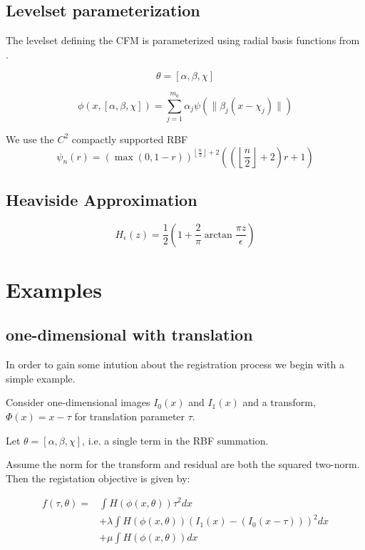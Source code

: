 \documentclass[]{paper}
\begin{document}
\subsection{Levelset parameterization}
The levelset defining the CFM is parameterized using radial basis
functions from \cite{Aghasi2011}.

\[
\theta = [\alpha, \beta, \chi]
\] 

\[
\phi(x,[\alpha, \beta, \chi]) = \sum_{j = 1}^{m_0} \alpha_j
\psi(\|\beta_j(x - \chi_j)\|) 
\]

We use the $C^2$ compactly supported RBF
\[
\psi_{n}(r) = \left ( \max{\left ( 0,1 - r \right )} \right )^{\left\lfloor
  \frac{n}{2}\right\rfloor + 2}\left ( \left ( \left\lfloor
  \frac{n}{2}\right\rfloor + 2 \right ) r+1 \right ) 
\]

\subsection{Heaviside Approximation}

\[
H_\epsilon(z) = \frac{1}{2} \left (  1 + \frac{2}{\pi}
  \arctan{\frac{\pi z}{\epsilon}} \right )
\]

\section{Examples}

\subsection{one-dimensional with translation }
In order to gain some intution about the registration process we begin
with a simple example.
\par
Consider one-dimensional images $I_0(x)$ and $I_1(x)$ and a
transform, $\Phi(x) = x - \tau$ for translation parameter $\tau$.
\par
Let $\theta = [\alpha, \beta, \chi]$, i.e. a single term in the RBF
summation.
\par
Assume the norm for the transform and residual are both the squared two-norm.
Then the registation objective is given by:

\begin{eqnarray*}
f(\tau,\theta) = & \int H(\phi(x,\theta)) \tau^2 dx \\
& + \lambda \int H(\phi(x,\theta))\left (I_1(x) - (I_0(x-\tau)) \right )^2dx \\
& + \mu \int H(\phi(x,\theta)) dx
\end{eqnarray*}
\end{document}
